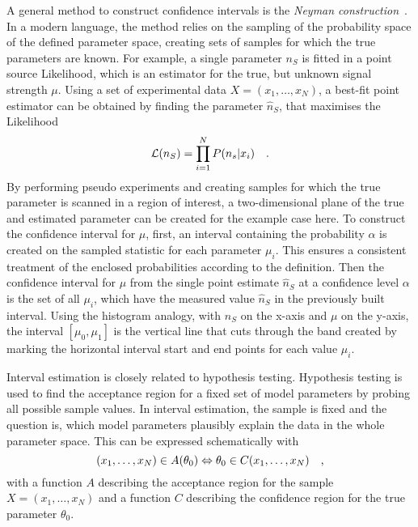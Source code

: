 A general method to construct confidence intervals is the \emph{Neyman construction} \cite{Neyman:1937cls}.
In a modern language, the method relies on the sampling of the probability space of the defined parameter space, creating sets of samples for which the true parameters are known.
For example, a single parameter $n_S$ is fitted in a point source Likelihood, which is an estimator for the true, but unknown signal strength $\mu$.
Using a set of experimental data $X=(x_1, \dots, x_N)$, a best-fit point estimator can be obtained by finding the parameter $\hat{n}_S$, that maximises the Likelihood
\begin{equation}
  \mathcal{L}(n_S) = \prod_{i=1}^N P(n_s|x_i)
  \quad\text{.}
\end{equation}
By performing pseudo experiments and creating samples for which the true parameter is scanned in a region of interest, a two-dimensional plane of the true and estimated parameter can be created for the example case here.
To construct the confidence interval for $\mu$, first, an interval containing the probability $\alpha$ is created on the sampled statistic for each parameter $\mu_i$.
This ensures a consistent treatment of the enclosed probabilities according to the definition.
Then the confidence interval for $\mu$ from the single point estimate $\hat{n}_S$ at a confidence level $\alpha$ is the set of all $\mu_i$, which have the measured value $\hat{n}_S$ in the previously built interval.
Using the histogram analogy, with $n_S$ on the x-axis and $\mu$ on the y-axis, the interval $[\mu_0, \mu_1]$ is the vertical line that cuts through the band created by marking the horizontal interval start and end points for each value $\mu_i$.

Interval estimation is closely related to hypothesis testing.
Hypothesis testing is used to find the acceptance region for a fixed set of model parameters by probing all possible sample values.
In interval estimation, the sample is fixed and the question is, which model parameters plausibly explain the data in the whole parameter space.
This can be expressed schematically with
\begin{equation}
  (x_1, \dots, x_N) \in A(\theta_0)
  \Leftrightarrow
  \theta_0 \in C(x_1, \dots, x_N)
  \quad\text{,}
\end{equation}
with a function $A$ describing the acceptance region for the sample $X=(x_1, \dots, x_N)$ and a function $C$ describing the confidence region for the true parameter $\theta_0$.
